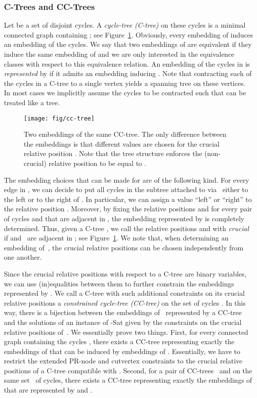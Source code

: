\documentclass{scrartcl}
\newcommand{\1}[1]{{\normalfont \ensuremath{#1^{\tiny\circled{1}}}}} \newcommand{\2}[1]{{\normalfont \ensuremath{#1^{\tiny\circled{2}}}}} \renewcommand{\k}[1]{{\normalfont \ensuremath{#1^{\tiny\circled{k}}}}} \newcommand{\proj}[2]{\ensuremath{\left.#1\right|_{#2}}} \newcommand{\eps}{\varepsilon}
\theoremstyle{plain} \newtheorem{theorem}{Theorem} \newcounter{lemmacounter} \setcounter{lemmacounter}{0} \newtheorem{lemma}[lemmacounter]{Lemma} \newtheorem{fact}{Fact}  \newtheorem{corollary}{Corollary} \theoremstyle{definition} \newtheorem{definition}{Definition}
\begin{document}
\subsubsection*{C-Trees and CC-Trees}
\label{sec:cc-trees}

Let  be a set of disjoint cycles.  A
\emph{cycle-tree (C-tree)}  on these cycles
is a minimal connected graph containing ; see
Figure~\ref{fig:cc-tree}.  Obviously, every embedding of  induces an embedding of the cycles.  We say that two
embeddings of  are equivalent if they induce
the same embedding of  and we are only interested in the
equivalence classes with respect to this equivalence relation.  An
embedding  of the cycles in  is
\emph{represented} by  if it admits an
embedding inducing .  Note that contracting each of the
cycles  in a C-tree to a single
vertex yields a spanning tree on these vertices.  In most cases we
implicitly assume the cycles to be contracted such that  can be treated like a tree.

\begin{figure}
  \centering
  \texttt{[image: fig/cc-tree]}
  \caption{Two embeddings of the same CC-tree.  The only difference
    between the embeddings is that different values are chosen for the
    crucial relative position .  Note that the tree
    structure enforces the (non-crucial) relative position
     to be equal to .}
  \label{fig:cc-tree}
\end{figure}

The embedding choices that can be made for 
are of the following kind.  For every edge  in
, we can decide to put all cycles in the
subtree attached to  via~ either to the left or to the right of
.  In particular, we can assign a value ``left'' or ``right'' to
the relative position .  Moreover, by fixing the relative
positions  and  for every pair of cycles 
and  that are adjacent in , the embedding
represented by  is completely determined.
Thus, given a C-tree , we call the relative
positions  and  with 
\emph{crucial} if  and~ are adjacent in ; see Figure~\ref{fig:cc-tree}.  We note that, when determining
an embedding of~, the crucial relative
positions can be chosen independently from one another.

Since the crucial relative positions with respect to a C-tree
 are binary variables, we can use
(in)equalities between them to further constrain the embeddings
represented by .  We call a C-tree with such
additional constraints on its crucial relative positions a
\emph{constrained cycle-tree (CC-tree)} on the set of cycles .  In this way, there is a bijection between the embeddings
of~ represented by a CC-tree and the solutions of an
instance of {-Sat} given by the constraints on the crucial
relative positions of~.  We essentially prove
two things.  First, for every connected graph  containing the
cycles , there exists a CC-tree representing exactly the
embeddings of  that can be induced by embeddings of .
Essentially, we have to restrict the extended PR-node and cutvertex
constraints to the crucial relative positions of a C-tree compatible
with .  Second, for a pair of CC-trees~ and  on the same set~ of cycles, there exists a CC-tree 
representing exactly the embeddings of  that are
represented by  and .
\end{document}
